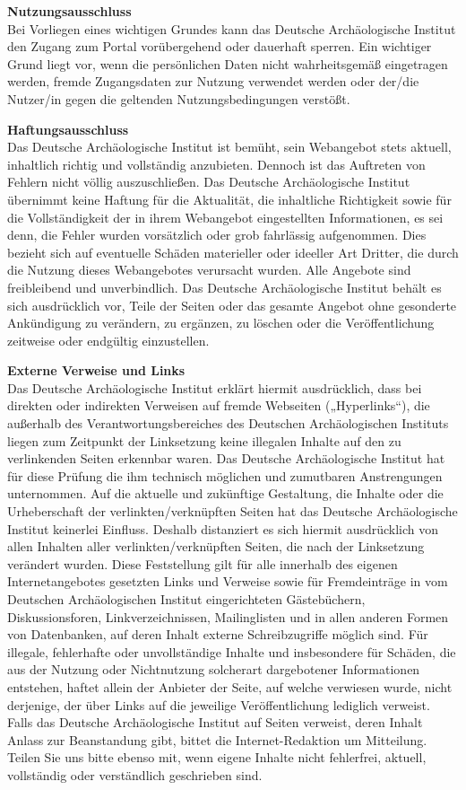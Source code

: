 {\textbf{Nutzungsausschluss}\\
Bei Vorliegen eines wichtigen Grundes kann das Deutsche Archäologische Institut den Zugang zum Portal \iDAI vorübergehend oder dauerhaft sperren. Ein wichtiger Grund liegt vor, wenn die persönlichen Daten nicht wahrheitsgemäß eingetragen werden, fremde Zugangsdaten zur Nutzung verwendet werden oder der/die Nutzer/in gegen die geltenden Nutzungsbedingungen verstößt.

\textbf{Haftungsausschluss}\\
Das Deutsche Archäologische Institut ist bemüht, sein Webangebot stets aktuell, inhaltlich richtig und vollständig anzubieten. Dennoch ist das Auftreten von Fehlern nicht völlig auszuschließen. Das Deutsche Archäologische Institut übernimmt keine Haftung für die Aktualität, die inhaltliche Richtigkeit sowie für die Vollständigkeit der in ihrem Webangebot eingestellten Informationen, es sei denn, die Fehler wurden vorsätzlich oder grob fahrlässig aufgenommen. Dies bezieht sich auf eventuelle Schäden materieller oder ideeller Art Dritter, die durch die Nutzung dieses Webangebotes verursacht wurden. Alle Angebote sind freibleibend und unverbindlich. Das Deutsche Archäologische Institut behält es sich ausdrücklich vor, Teile der Seiten oder das gesamte Angebot ohne gesonderte Ankündigung zu verändern, zu ergänzen, zu löschen oder die Veröffentlichung zeitweise oder endgültig einzustellen.


\textbf{Externe Verweise und Links}\\
Das Deutsche Archäologische Institut erklärt hiermit ausdrücklich, dass bei direkten oder indirekten Verweisen auf fremde Webseiten („Hyperlinks“), die außerhalb des Verantwortungsbereiches des Deutschen Archäologischen Instituts liegen zum Zeitpunkt der Linksetzung keine illegalen Inhalte auf den zu verlinkenden Seiten erkennbar waren. Das Deutsche Archäologische Institut hat für diese Prüfung die ihm technisch möglichen und zumutbaren Anstrengungen unternommen. Auf die aktuelle und zukünftige Gestaltung, die Inhalte oder die Urheberschaft der verlinkten/verknüpften Seiten hat das Deutsche Archäologische Institut keinerlei Einfluss. Deshalb distanziert es sich hiermit ausdrücklich von allen Inhalten aller verlinkten/verknüpften Seiten, die nach der Linksetzung verändert wurden. Diese Feststellung gilt für alle innerhalb des eigenen Internetangebotes gesetzten Links und Verweise sowie für Fremdeinträge in vom Deutschen Archäologischen Institut eingerichteten Gästebüchern, Diskussionsforen, Linkverzeichnissen, Mailinglisten und in allen anderen Formen von Datenbanken, auf deren Inhalt externe Schreibzugriffe möglich sind. Für illegale, fehlerhafte oder unvollständige Inhalte und insbesondere für Schäden, die aus der Nutzung oder Nichtnutzung solcherart dargebotener Informationen entstehen, haftet allein der Anbieter der Seite, auf welche verwiesen wurde, nicht derjenige, der über Links auf die jeweilige Veröffentlichung lediglich verweist. Falls das Deutsche Archäologische Institut auf Seiten verweist, deren Inhalt Anlass zur Beanstandung gibt, bittet die Internet-Redaktion um Mitteilung. Teilen Sie uns bitte ebenso mit, wenn eigene Inhalte nicht fehlerfrei, aktuell, vollständig oder verständlich geschrieben sind.

}
